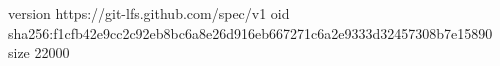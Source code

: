 version https://git-lfs.github.com/spec/v1
oid sha256:f1cfb42e9cc2c92eb8bc6a8e26d916eb667271c6a2e9333d32457308b7e15890
size 22000
